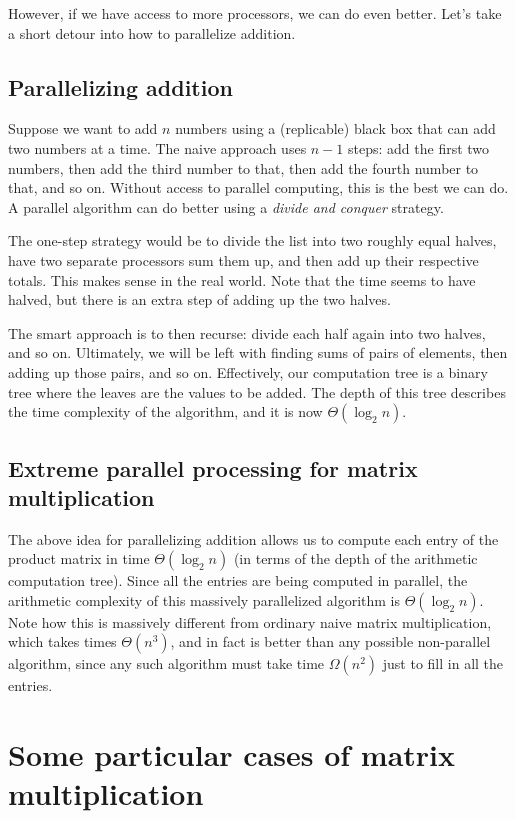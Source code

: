 \documentclass[10pt]{amsart}
\begin{document}
However, if we have access to more processors, we can do even
better. Let's take a short detour into how to parallelize addition.

\subsection{Parallelizing addition}

Suppose we want to add $n$ numbers using a (replicable) black box that
can add two numbers at a time. The naive approach uses $n - 1$ steps:
add the first two numbers, then add the third number to that, then add
the fourth number to that, and so on. Without access to parallel
computing, this is the best we can do. A parallel algorithm can do
better using a {\em divide and conquer} strategy.

The one-step strategy would be to divide the list into two roughly
equal halves, have two separate processors sum them up, and then add
up their respective totals. This makes sense in the real world. Note
that the time seems to have halved, but there is an extra step of
adding up the two halves.

The smart approach is to then recurse: divide each half again into two
halves, and so on. Ultimately, we will be left with finding sums of
pairs of elements, then adding up those pairs, and so on. Effectively,
our computation tree is a binary tree where the leaves are the values
to be added. The depth of this tree describes the time complexity of
the algorithm, and it is now $\Theta(\log_2n)$.

\subsection{Extreme parallel processing for matrix multiplication}

The above idea for parallelizing addition allows us to compute each
entry of the product matrix in time $\Theta(\log_2 n)$ (in terms of the
depth of the arithmetic computation tree). Since all the entries are
being computed in parallel, the arithmetic complexity of this
massively parallelized algorithm is $\Theta(\log_2 n)$. Note how this is
massively different from ordinary naive matrix multiplication, which
takes times $\Theta(n^3)$, and in fact is better than any possible
non-parallel algorithm, since any such algorithm must take time
$\Omega(n^2)$ just to fill in all the entries.

\section{Some particular cases of matrix multiplication}
\end{document}
